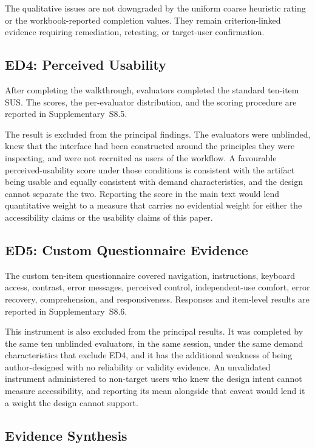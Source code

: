 \documentclass[journal]{IEEEtran}
\begin{document}
The qualitative issues are not downgraded by the uniform coarse heuristic rating or the workbook-reported completion values. They remain criterion-linked evidence requiring remediation, retesting, or target-user confirmation.

\FloatBarrier
\subsection{ED4: Perceived Usability}
\label{subsec:sus}

After completing the walkthrough, evaluators completed the standard ten-item SUS\cite{brooke1996sus}. The scores, the per-evaluator distribution, and the scoring procedure are reported in Supplementary~S8.5.

The result is excluded from the principal findings. The evaluators were unblinded, knew that the interface had been constructed around the principles they were inspecting, and were not recruited as users of the workflow. A favourable perceived-usability score under those conditions is consistent with the artifact being usable and equally consistent with demand characteristics, and the design cannot separate the two. Reporting the score in the main text would lend quantitative weight to a measure that carries no evidential weight for either the accessibility claims or the usability claims of this paper.

\subsection{ED5: Custom Questionnaire Evidence}
\label{subsec:a11y-questionnaire}

The custom ten-item questionnaire covered navigation, instructions, keyboard access, contrast, error messages, perceived control, independent-use comfort, error recovery, comprehension, and responsiveness. Responses and item-level results are reported in Supplementary~S8.6.

This instrument is also excluded from the principal results. It was completed by the same ten unblinded evaluators, in the same session, under the same demand characteristics that exclude ED4, and it has the additional weakness of being author-designed with no reliability or validity evidence. An unvalidated instrument administered to non-target users who knew the design intent cannot measure accessibility, and reporting its mean alongside that caveat would lend it a weight the design cannot support.

\subsection{Evidence Synthesis}
\label{subsec:discussion-results}
\end{document}
